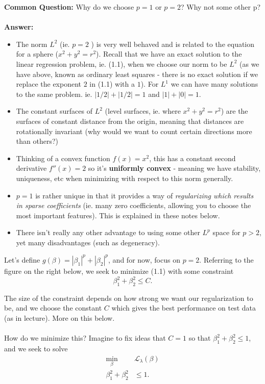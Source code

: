 \documentclass[paper=a4, fontsize=11pt]{scrartcl} %
\numberwithin{equation}{section} %
\numberwithin{figure}{section} %
\numberwithin{table}{section} %
\begin{document}
\textbf{Common Question:} Why do we choose $p=1$ or $p=2$? Why not some other p?\\\\

\textbf{Answer:} 
\begin{itemize}
\item The norm $L^2$ (ie. $p=2$ )  is very well behaved and is related to the equation for a sphere ($x^2+y^2 = r^2$). Recall that we have an exact solution to the linear regression problem, ie. (1.1), when we choose our norm
to be $L^2$ (as we have above, known as ordinary least squares - there is no exact solution if we replace the exponent $2$ in (1.1) with a $1$). For $L^1$ we can have many solutions to the same problem. ie. $|1/2| + |1/2| = 1$ and $|1|+|0|=1$. 
\item The constant surfaces of $L^2$ (level surfaces, ie. where $x^2 + y^2 = r^2$) are the surfaces of constant distance from the origin, meaning that distances are rotationally invariant (why would we want to count certain directions more than others?)
\item Thinking of a convex function $f(x) = x^2$, this has a constant second derivative $f''(x) = 2$ so it's \textbf{uniformly convex} - meaning we have stability, uniqueness, etc when minimizing with respect to this norm generally.
\item $p=1$ is rather unique in that it provides a way of \emph{regularizing which results in sparse coefficients } (ie. many zero coefficients, allowing you to choose the most important features). This is explained in these notes below.
\item There isn't really any other advantage to using some other $L^p$ space for $p > 2$, yet many disadvantages (such as degeneracy). 
\end{itemize}

Let's define $g(\beta) = |\beta_1|^p + |\beta_2|^p$, and for now, focus on $p=2$. Referring to the figure on the right below, we seek to minimize (1.1) with some constraint
\[ \beta_1^2 + \beta_2^2 \leq C.\]

The size of the constraint depends on how strong we want our regularization to be, and we choose the constant $C$ which gives the best performance on test data (as in lecture). More on this below.\\\\


How do we minimize this? Imagine to fix ideas that $C=1$ so that $\beta_1^2 + \beta_2^2 \leq 1$, and we seek to solve
\begin{align}
\min_{\beta} \; &\mathcal{L}_{\lambda} (\beta) \\
\beta_1^2 + \beta_2^2 &\leq 1.
\end{align}
\end{document}
